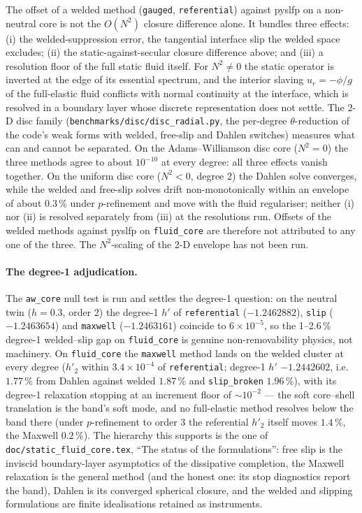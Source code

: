 \documentclass[11pt]{article}
\numberwithin{equation}{section}
\newcommand{\code}[1]{\texttt{#1}}
\begin{document}
The offset of a welded method (\code{gauged}, \code{referential}) against
pyslfp on a non-neutral core is not the $O(N^2)$ closure difference alone.
It bundles three effects: (i) the welded-suppression error, the tangential
interface slip the welded space excludes; (ii) the static-against-secular
closure difference above; and (iii) a resolution floor of the full static
fluid itself. For $N^2\ne0$ the static operator is inverted at the edge of
its essential spectrum, and the interior slaving $u_r=-\phi/g$ of the
full-elastic fluid conflicts with normal continuity at the interface, which
is resolved in a boundary layer whose discrete representation does not
settle. The 2-D disc family (\code{benchmarks/disc/disc\_radial.py}, the
per-degree $\theta$-reduction of the code's weak forms with welded,
free-slip and Dahlen switches) measures what can and cannot be separated.
On the Adams--Williamson disc core ($N^2=0$) the three methods agree to
about $10^{-10}$ at every degree: all three effects vanish together. On the
uniform disc core ($N^2<0$, degree 2) the Dahlen solve converges, while the
welded and free-slip solves drift non-monotonically within an envelope of
about $0.3\,\%$ under $p$-refinement and move with the fluid regulariser;
neither (i) nor (ii) is resolved separately from (iii) at the resolutions
run. Offsets of the welded methods against pyslfp on \code{fluid\_core} are
therefore not attributed to any one of the three. The
$N^2$-scaling of the 2-D envelope has not been run.

\paragraph{The degree-1 adjudication.} The \code{aw\_core}
null test is run and settles the degree-1 question: on the neutral twin
($h=0.3$, order 2) the degree-1 $h'$ of \code{referential}
($-1.2462882$), \code{slip} ($-1.2463654$) and \code{maxwell}
($-1.2463161$) coincide to $6\times10^{-5}$, so the 1--2.6\,\%
degree-1 welded--slip gap on \code{fluid\_core} is genuine
non-removability physics, not machinery. On \code{fluid\_core} the
\code{maxwell} method lands on the welded cluster at every degree
($h'_2$ within $3.4\times10^{-4}$ of \code{referential}; degree-1
$h'$ $-1.2442602$, i.e.\ $1.77\,\%$ from Dahlen against welded
$1.87\,\%$ and \code{slip\_broken} $1.96\,\%$), with its degree-1
relaxation stopping at an increment floor of $\sim10^{-2}$ --- the
soft core--shell translation is the band's soft mode, and no
full-elastic method resolves below the band there (under
$p$-refinement to order 3 the referential $h'_2$ itself moves
$1.4\,\%$, the Maxwell $0.2\,\%$). The hierarchy this supports is the
one of \code{doc/static\_fluid\_core.tex}, ``The status of the
formulations'': free slip is the inviscid boundary-layer asymptotics
of the dissipative completion, the Maxwell relaxation is the general
method (and the honest one: its stop diagnostics report the band),
Dahlen is its converged spherical closure, and the welded and
slipping formulations are finite idealisations retained as
instruments.
\end{document}

